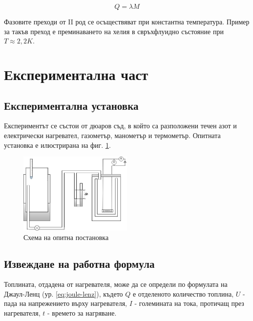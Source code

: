 \documentclass[12pt]{article}
\begin{document}
\begin{equation}\label{eq:q-lambda}
    Q = \lambda M
\end{equation}

Фазовите преходи от II род се осъществяват при константна температура. Пример за такъв преход е преминаването на хелия в свръхфлуидно състояние при $T \approx 2,2 K$.

\section{Експериментална част}

\subsection{Експериментална установка}
Експериментът се състои от дюаров съд, в който са разположени течен азот и електрически нагревател, газометър, манометър и термометър. Опитната установка е илюстрирана на фиг. \ref{fig:setup}.

\begin{figure}
    \centering
    \includegraphics[width=0.5\textwidth]{images/setup-liq-n2.png}
    \caption{\label{fig:setup}Схема на опитна постановка}
    \label{fig:setup}
\end{figure}

\subsection{Извеждане на работна формула}

Топлината, отдадена от нагревателя, може да се определи по формулата на Джаул-Ленц (ур. \ref{eq:joule-lenz}), където $Q$ е отделеното количество топлина, $U$ - пада на напрежението върху нагревателя, $I$ - големината на тока, протичащ през нагревателя, $t$ - времето за нагряване. 
\end{document}
